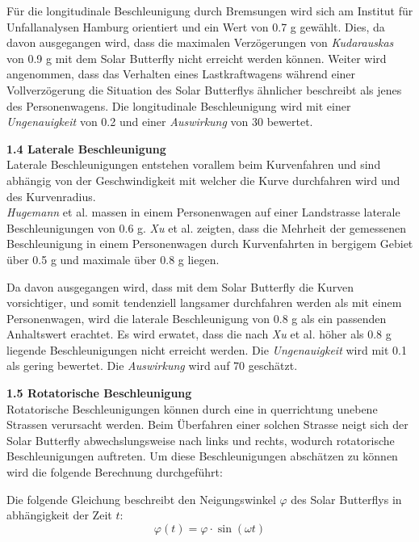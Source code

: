 \begin{description}
    Für die longitudinale Beschleunigung durch Bremsungen wird sich am Institut für Unfallanalysen Hamburg orientiert und ein Wert von 0.7 g gewählt. Dies, da davon ausgegangen wird, dass die maximalen Verzögerungen von \emph{Kudarauskas} von 0.9 g mit dem Solar Butterfly nicht erreicht werden können. Weiter wird angenommen, dass das Verhalten eines Lastkraftwagens während einer Vollverzögerung die Situation des Solar Butterflys ähnlicher beschreibt als jenes des Personenwagens.
    Die longitudinale Beschleunigung wird mit einer \emph{Ungenauigkeit} von 0.2 und einer \emph{Auswirkung} von 30 bewertet.

    \item \textbf{1.4 Laterale Beschleunigung}\\
    Laterale Beschleunigungen entstehen vorallem beim Kurvenfahren und sind abhängig von der Geschwindigkeit mit welcher die Kurve durchfahren wird und des Kurvenradius.\\
    \emph{Hugemann} et al. \cite{Kurv.1} massen in einem Personenwagen auf einer Landstrasse laterale Beschleunigungen von 0.6 g. \emph{Xu} et al. \cite{Kurv.2} zeigten, dass die Mehrheit der gemessenen Beschleunigung in einem Personenwagen durch Kurvenfahrten in bergigem Gebiet über 0.5 g und maximale über 0.8 g liegen.

    Da davon ausgegangen wird, dass mit dem Solar Butterfly die Kurven vorsichtiger, und somit tendenziell langsamer durchfahren werden als mit einem Personenwagen, wird die laterale Beschleunigung von 0.8 g als ein passenden Anhaltswert erachtet. Es wird erwatet, dass die nach \emph{Xu} et al. höher als 0.8 g liegende Beschleunigungen nicht erreicht werden. Die \emph{Ungenauigkeit} wird mit 0.1 als gering bewertet. Die \emph{Auswirkung} wird auf 70 geschätzt.

    \item \textbf{1.5 Rotatorische Beschleunigung}\\
    Rotatorische Beschleunigungen können durch eine in querrichtung unebene Strassen verursacht werden. Beim Überfahren einer solchen Strasse neigt sich der Solar Butterfly abwechslungsweise nach links und rechts, wodurch rotatorische Beschleunigungen auftreten. Um diese Beschleunigungen abschätzen zu können wird die folgende Berechnung durchgeführt:

    Die folgende Gleichung beschreibt den Neigungswinkel $\varphi$ des Solar Butterflys in abhängigkeit der Zeit $t$:
    \begin{equation}
      \varphi(t) =  \varphi \cdot \sin \left(\omega t \right)
    \end{equation}


\end{description}
